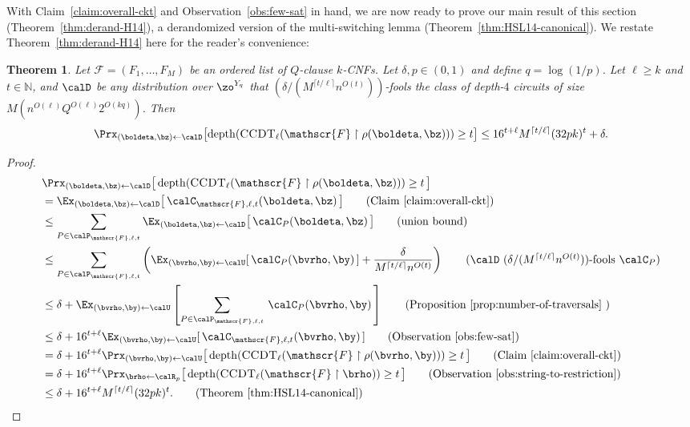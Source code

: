 \documentclass[11pt]{article}
\numberwithin{equation}{section}
\newtheorem{theorem}{Theorem}[section]
\theoremstyle{definition}
\theoremstyle{plain}
\newcommand{\N}{\mathbb N}
\theoremstyle{plain}
\newcommand{\uhr}{\upharpoonright}
\newcommand{\CCDT}{\textsc{CCDT}}
\newcommand{\depth}{\mathrm{depth}}
\renewcommand{\N}{\mathds{N}}
\begin{document}
With Claim~\ref{claim:overall-ckt} and Observation~\ref{obs:few-sat} in hand, we are now ready to prove our main result of this section (Theorem~\ref{thm:derand-H14}), a derandomized version of the multi-switching lemma (Theorem~\ref{thm:HSL14-canonical}). We restate Theorem~\ref{thm:derand-H14} here for the reader's convenience: 


\begin{theorem} 
Let $\mathscr{F} = (F_1,\ldots,F_M)$ be an ordered list of $Q$-clause $k$-CNFs. Let $\delta,p \in (0,1)$ and define $q = \log(1/p)$. Let $\ell \geq k$ and $t\in \N$, and  $\calD$ be any distribution over $\zo^{Y_q}$ that $(\delta/(M^{\lceil t/\ell\rceil} n^{O(t)}))$-fools the class of depth-$4$ circuits of size $M(n^{O(\ell)}Q^{O(\ell)} 2^{O(kq)})$.  Then
 \[ \Prx_{(\boldeta,\bz)\leftarrow\calD}\big[ \depth(\CCDT_{\ell}(\mathscr{F}\uhr\rho(\boldeta,\bz))) \ge t\big] \le 16^{t+\ell}M^{\lceil t/\ell\rceil} (32pk)^t + \delta. \]
\end{theorem}

\begin{proof} 
\begin{align*}
&\Prx_{(\boldeta,\bz)\leftarrow\calD}\big[\,\depth(\CCDT_\ell(\mathscr{F}\uhr\rho(\boldeta,\bz))) \ge t\,\big] \\ 
&= \Ex_{(\boldeta,\bz)\leftarrow\calD}\big[\,\calC_{\mathscr{F},\ell,t}(\boldeta,\bz)\,\big] \tag*{(Claim~\ref{claim:overall-ckt})}\\
&\le \sum_{P \in \calP_{\mathscr{F},\ell,t}}\Ex_{(\boldeta,\bz)\leftarrow\calD}\big[\,\calC_P(\boldeta,\bz)\,\big]  \tag*{(union bound)} \\
&\le \sum_{P \in \calP_{\mathscr{F},\ell,t}}\left(\Ex_{(\bvrho,\by)\leftarrow\calU}[\,\calC_P(\bvrho,\by) \,] + \frac{\delta}{M^{\lceil t/\ell\rceil} n^{O(t)}}\right) \tag*{($\calD$ $(\delta/(M^{\lceil t/\ell\rceil} n^{O(t)}))$-fools $\calC_P$)} \\
&\le \delta + \Ex_{(\bvrho,\by)\leftarrow\calU}\left[\sum_{P \in \calP_{\mathscr{F},\ell,t}}\,\calC_P(\bvrho,\by) \,\right] \tag*{(Proposition~\ref{prop:number-of-traversals} 
)} \\
&\le \delta + 16^{t+\ell} \Ex_{(\bvrho,\by)\leftarrow\calU}[\,\calC_{\mathscr{F},\ell,t}(\bvrho,\by)\,] \tag*{(Observation~\ref{obs:few-sat})} \\
&= \delta + 16^{t+\ell} \Prx_{(\bvrho,\by)\leftarrow\calU}\big[\,\depth(\CCDT_\ell(\mathscr{F}\uhr\rho(\bvrho,\by))) \ge t\,\big] \tag*{(Claim~\ref{claim:overall-ckt})}\\
&= \delta + 16^{t+\ell} \Prx_{\brho\leftarrow\calR_p}\big[\,\depth(\CCDT_\ell(\mathscr{F}\uhr \brho)) \ge t\,\big] \tag*{(Observation~\ref{obs:string-to-restriction})}  \\ 
&\le \delta + 16^{t+\ell} M^{\lceil t/\ell\rceil} (32pk)^t. \tag*{(Theorem~\ref{thm:HSL14-canonical})} 
\end{align*} 
\end{proof} 
\end{document}
